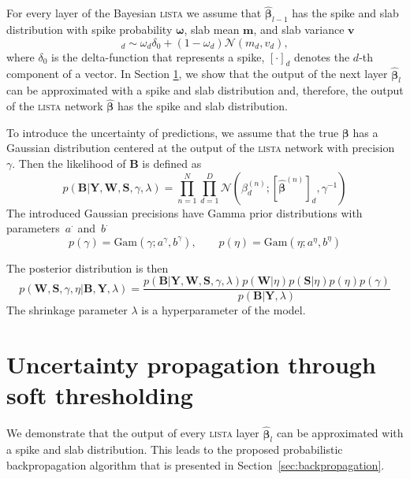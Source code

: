 \documentclass{article}
\begin{document}
For every layer of the Bayesian \textsc{lista} we assume that $\widehat{\boldsymbol\beta}_{l-1}$ has the spike and slab distribution with spike probability $\boldsymbol\omega$, slab mean $\mathbf{m}$, and slab variance $\mathbf{v}$
\begin{equation}
[\widehat{\boldsymbol\beta}_{l-1}]_d \sim \omega_d \delta_0 + (1 - \omega_d)\mathcal{N}(m_d, v_d),
\end{equation}
where $\delta_0$ is the delta-function that represents a spike, $[\cdot]_d$ denotes the $d$-th component of a vector. In Section \ref{sec:fprop}, we show that the output of the next layer $\widehat{\boldsymbol\beta}_l$ can be approximated with a spike and slab distribution and, therefore, the output of the \textsc{lista} network $\widehat{\boldsymbol\beta}$ has the spike and slab distribution.

To introduce the uncertainty of predictions, we assume that the true $\boldsymbol\beta$ has a Gaussian distribution centered at the output of the \textsc{lista} network with precision $\gamma$. Then the likelihood of $\mathbf{B}$ is defined as
\begin{equation}
\label{eq:likelihood}
p(\mathbf{B}| \mathbf{Y}, \mathbf{W}, \mathbf{S}, \gamma, \lambda) = \prod_{n=1}^N\prod_{d=1}^D\mathcal{N}\left(\beta_d^{(n)}; [\widehat{\boldsymbol\beta}^{(n)}]_d, \gamma^{-1}\right)
\end{equation}
The introduced Gaussian precisions have Gamma prior distributions with parameters~$a^{\cdot}$ and~$b^{\cdot}$
\begin{equation}
\label{eq:gamma_eta}
p(\gamma) = \text{Gam}\left(\gamma; a^{\gamma}, b^{\gamma}\right), \qquad
p(\eta) = \text{Gam}\left(\eta; 	a^{\eta}, b^{\eta}\right)
\end{equation}

The posterior distribution is then
\begin{equation}
\label{eq:posterior}
p(\mathbf{W}, \mathbf{S}, \gamma, \eta | \mathbf{B}, \mathbf{Y}, \lambda) = \frac{p(\mathbf{B} | \mathbf{Y}, \mathbf{W},  \mathbf{S}, \gamma, \lambda) p(\mathbf{W} | \eta )p(\mathbf{S} | \eta) p(\eta) p(\gamma)}{p(\mathbf{B} | \mathbf{Y}, \lambda)}
\end{equation}
The shrinkage parameter $\lambda$ is a hyperparameter of the model.

\section{Uncertainty propagation through soft thresholding}
\label{sec:fprop}
We demonstrate that the output of every \textsc{lista} layer $\widehat{\boldsymbol\beta}_l$ can be approximated with a spike and slab distribution. This leads to the proposed probabilistic backpropagation algorithm that is presented in Section~\ref{sec:backpropagation}.
\end{document}
